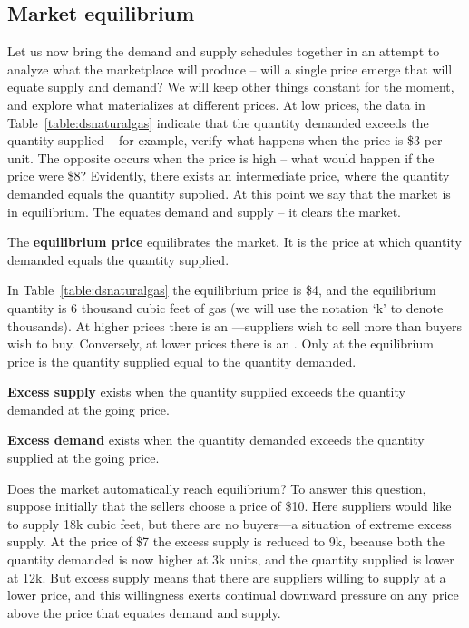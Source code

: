\newhtmlpage

\subsection*{Market equilibrium}

Let us now bring the demand and supply schedules together in an attempt to
analyze what the marketplace will produce -- will a single price emerge
that will equate supply and demand? We will keep other things constant for
the moment, and explore what materializes at different prices. At low
prices, the data in Table~\ref{table:dsnaturalgas} indicate that the
quantity demanded exceeds the quantity supplied -- for example, verify what
happens when the price is \$3 per unit. The opposite occurs when the price
is high -- what would happen if the price were \$8? Evidently, there exists
an intermediate price, where the quantity demanded equals the quantity
supplied. At this point we say that the market is in equilibrium. The %
 equates demand and supply -- it clears the
market.

\begin{DefBox}
The \textbf{equilibrium price} equilibrates the market. It is the price at which quantity demanded equals the quantity supplied.
\end{DefBox}

In Table~\ref{table:dsnaturalgas} the equilibrium price is \$4, and the
equilibrium quantity is 6 thousand cubic feet of gas (we will use the
notation `k' to denote thousands). At higher prices there is an %
---suppliers wish to sell more than buyers wish
to buy. Conversely, at lower prices there is an .
Only at the equilibrium price is the quantity supplied equal to the quantity demanded.

\begin{DefBox}
\textbf{Excess supply} exists when the quantity supplied exceeds the quantity demanded at the going price.

\textbf{Excess demand} exists when the quantity demanded exceeds the quantity supplied at the going price.
\end{DefBox}

Does the market automatically reach equilibrium? To answer this question,
suppose initially that the sellers choose a price of \$10. Here suppliers
would like to supply 18k cubic feet, but there are no buyers---a situation
of extreme excess supply. At the price of \$7 the excess supply is reduced
to 9k, because both the quantity demanded is now higher at 3k units, and the
quantity supplied is lower at 12k. But excess supply means that there are
suppliers willing to supply at a lower price, and this willingness exerts
continual downward pressure on any price above the price that equates demand
and supply.

